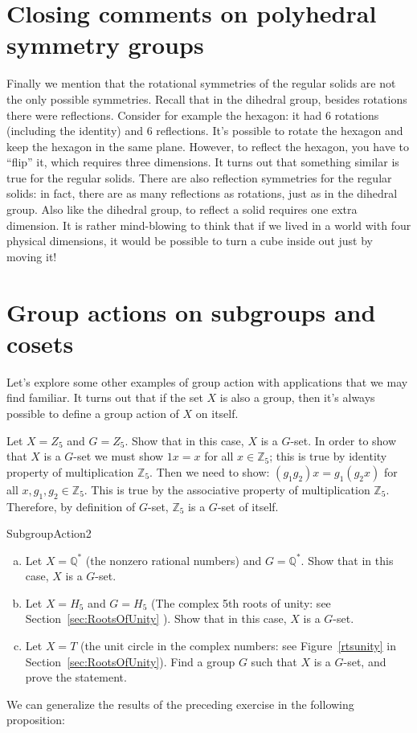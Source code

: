 \section{Closing comments on polyhedral symmetry groups}
Finally we mention that the rotational symmetries of the regular solids are not the only possible symmetries. Recall that in the dihedral group, besides rotations there were reflections. Consider for example the hexagon: it had 6 rotations (including the identity) and 6 reflections. It's possible to rotate the hexagon and keep the hexagon in the same plane. However, to reflect the hexagon, you have to ``flip'' it, which requires three dimensions.  It turns out that something similar is true for the regular solids. There are also reflection symmetries for the regular solids: in fact, there are as many reflections as rotations, just as in the dihedral group. Also like the dihedral group, to reflect a solid requires one extra dimension. It is rather mind-blowing to think that if we lived in a world with four physical dimensions, it would be possible to turn a cube inside out just by moving it!
\section{Group actions on subgroups and cosets}\label{SubgroupsAndCosets}
Let's explore some other examples of group action with applications that we may find familiar.   It turns out that if the set $X$ is also a group, then it's always possible to define a group action of $X$ on itself.

\begin{example}\label{example:actions:SubgroupAction1}
Let $X= Z_5$  and $G = Z_5$. Show that in this case, $X$ is a $G$-set.
In order to show that $X$ is a $G$-set we must show $1x = x$ for all $x \in\mathbb {Z}_5$; this is true by identity property of multiplication $\mathbb{Z}_5$.  Then we need to show: $(g_1g_2)x = g_1(g_2x)$ for all $x, g_1,g_2 \in\mathbb{ Z}_5$. This is true by the associative property of multiplication $\mathbb {Z}_5$.  Therefore, by definition of $G$-set, $\mathbb{Z}_5$ is a $G$-set of itself.
\end {example}

\begin {exercise}{SubgroupAction2}
\begin {enumerate} [(a)]
\item Let $X =\mathbb{ Q}^* $ (the nonzero rational numbers) and $G = \mathbb{Q}^*$. Show that in this case, $X$ is a $G$-set.

\item Let $X = H_5$ and $G = H_5$ (The complex 5th roots of unity:  see Section~\ref{sec:RootsOfUnity}  ). Show that in this case, $X$ is a $G$-set.
\item Let $X = T$ (the unit circle in the complex numbers:  see Figure~\ref{rtsunity} in Section~\ref{sec:RootsOfUnity}).  Find a group $G$ such that $X$ is a $G$-set, and prove the statement.
\end{enumerate}
\end {exercise}
We can generalize the results of the preceding exercise in the following proposition:

